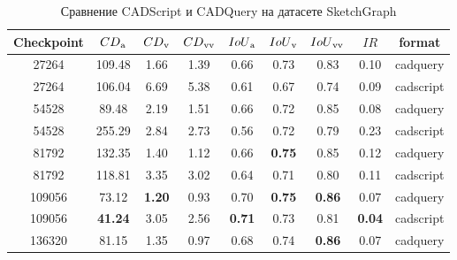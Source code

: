 \begin{table}[]
	\centering
	\caption{Сравнение CADScript и CADQuery на датасете SketchGraph}
	\label{tab:sg_comparison}
	\begin{tabular}{ccccccccc}
		\hline
		\textbf{Checkpoint} & $CD\textsubscript{a}$ & $CD\textsubscript{v}$ & $CD\textsubscript{vv}$ & $IoU\textsubscript{a}$ & $IoU\textsubscript{v}$ & $IoU\textsubscript{vv}$ & $IR$          & format    \\
		\hline
		27264               & 109.48                & 1.66                  & 1.39                   & 0.66                   & 0.73                   & 0.83                    & 0.10          & cadquery  \\
		27264               & 106.04                & 6.69                  & 5.38                   & 0.61                   & 0.67                   & 0.74                    & 0.09          & cadscript \\
		54528               & 89.48                 & 2.19                  & 1.51                   & 0.66                   & 0.72                   & 0.85                    & 0.08          & cadquery  \\
		54528               & 255.29                & 2.84                  & 2.73                   & 0.56                   & 0.72                   & 0.79                    & 0.23          & cadscript \\
		81792               & 132.35                & 1.40                  & 1.12                   & 0.66                   & \textbf{0.75}          & 0.85                    & 0.12          & cadquery  \\
		81792               & 118.81                & 3.35                  & 3.02                   & 0.64                   & 0.71                   & 0.80                    & 0.11          & cadscript \\
		109056              & 73.12                 & \textbf{1.20}         & 0.93                   & 0.70                   & \textbf{0.75}          & \textbf{0.86}           & 0.07          & cadquery  \\
		109056              & \textbf{41.24}        & 3.05                  & 2.56                   & \textbf{0.71}          & 0.73                   & 0.81                    & \textbf{0.04} & cadscript \\
		136320              & 81.15                 & 1.35                  & 0.97                   & 0.68                   & 0.74                   & \textbf{0.86}           & 0.07          & cadquery  \\

\end{tabular}
\end{table}
